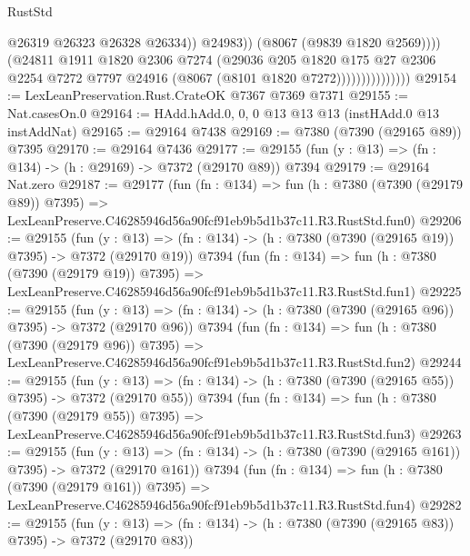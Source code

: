 \begin{lexlean}{RustStd}
\begin{coremodule}
                                      @26319
                                      @26323
                                      @26328
                                      @26334))
                                  @24983))
                              (@8067 (@9839 @1820 @2569))))
                          (@24811
                            @1911
                            @1820
                            @2306
                            @7274
                            (@29036
                              @205
                              @1820
                              @175
                              @27
                              @2306
                              @2254
                              @7272
                              @7797
                              @24916
                              (@8067 (@8101 @1820 @7272)))))))))))))))
@29154 := LexLeanPreservation.Rust.CrateOK @7367 @7369 @7371
@29155 := Nat.casesOn.{0}
@29164 := HAdd.hAdd.{0, 0, 0} @13 @13 @13 (instHAdd.{0} @13 instAddNat)
@29165 := @29164 @7438
@29169 := @7380 (@7390 (@29165 @89)) @7395
@29170 := @29164 @7436
@29177 := @29155 (fun (y : @13) => (fn : @134) -> (h : @29169) -> @7372 (@29170 @89)) @7394
@29179 := @29164 Nat.zero
@29187 := @29177
    (fun (fn : @134) =>
    fun (h : @7380 (@7390 (@29179 @89)) @7395) =>
    LexLeanPreserve.C46285946d56a90fcf91eb9b5d1b37c11.R3.RustStd.fun0)
@29206 := @29155
    (fun (y : @13) => (fn : @134) -> (h : @7380 (@7390 (@29165 @19)) @7395) -> @7372 (@29170 @19))
    @7394
    (fun (fn : @134) =>
    fun (h : @7380 (@7390 (@29179 @19)) @7395) =>
    LexLeanPreserve.C46285946d56a90fcf91eb9b5d1b37c11.R3.RustStd.fun1)
@29225 := @29155
    (fun (y : @13) => (fn : @134) -> (h : @7380 (@7390 (@29165 @96)) @7395) -> @7372 (@29170 @96))
    @7394
    (fun (fn : @134) =>
    fun (h : @7380 (@7390 (@29179 @96)) @7395) =>
    LexLeanPreserve.C46285946d56a90fcf91eb9b5d1b37c11.R3.RustStd.fun2)
@29244 := @29155
    (fun (y : @13) => (fn : @134) -> (h : @7380 (@7390 (@29165 @55)) @7395) -> @7372 (@29170 @55))
    @7394
    (fun (fn : @134) =>
    fun (h : @7380 (@7390 (@29179 @55)) @7395) =>
    LexLeanPreserve.C46285946d56a90fcf91eb9b5d1b37c11.R3.RustStd.fun3)
@29263 := @29155
    (fun (y : @13) => (fn : @134) -> (h : @7380 (@7390 (@29165 @161)) @7395) -> @7372 (@29170 @161))
    @7394
    (fun (fn : @134) =>
    fun (h : @7380 (@7390 (@29179 @161)) @7395) =>
    LexLeanPreserve.C46285946d56a90fcf91eb9b5d1b37c11.R3.RustStd.fun4)
@29282 := @29155
    (fun (y : @13) => (fn : @134) -> (h : @7380 (@7390 (@29165 @83)) @7395) -> @7372 (@29170 @83))

\end{coremodule}
\end{lexlean}
